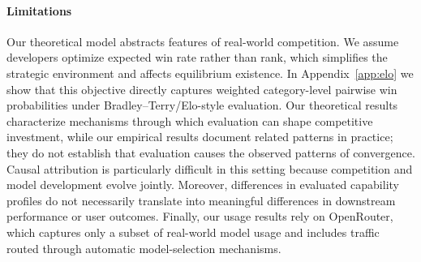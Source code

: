 \paragraph{Limitations}
Our theoretical model abstracts features of real-world competition.
We assume developers optimize expected win rate rather than rank, which simplifies the strategic environment and affects equilibrium existence.
In Appendix~\ref{app:elo} we show that this objective directly captures weighted category-level pairwise win probabilities under Bradley--Terry/Elo-style evaluation.
Our theoretical results characterize mechanisms through which evaluation can shape competitive investment, while our empirical results document related patterns in practice; they do not establish that evaluation causes the observed patterns of convergence. 
Causal attribution is particularly difficult in this setting because competition and model development evolve jointly.
Moreover, differences in evaluated capability profiles do not necessarily translate into meaningful differences in downstream performance or user outcomes.
Finally, our usage results rely on OpenRouter, which captures only a subset of real-world model usage and includes traffic routed through automatic model-selection mechanisms.
